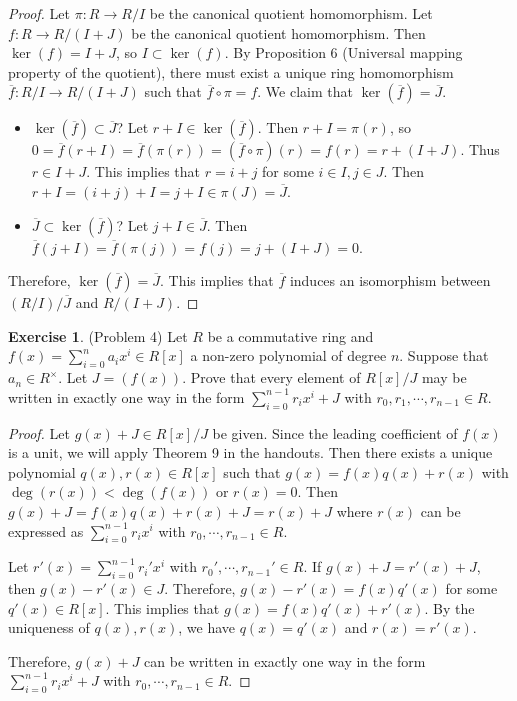 \documentclass[12pt, psamsfonts]{amsart}
\theoremstyle{definition}
\newtheorem*{exer}{Exercise}
\theoremstyle{remark}
\numberwithin{equation}{section}
\begin{document}
\begin{proof}
  Let $\pi: R \rightarrow R / I$ be the canonical quotient homomorphism.
  Let $f: R \rightarrow R / (I + J)$ be the canonical quotient homomorphism.
  Then $\ker(f) = I + J$, so $I \subset \ker(f)$.
  By Proposition 6 (Universal mapping property of the quotient), there must exist a unique ring homomorphism $\overline{f}: R / I \rightarrow R / (I + J)$ such that $\overline{f} \circ \pi = f$.
  We claim that $\ker(\overline{f}) = \overline{J}$.
  \begin{itemize}
    \item
      $\ker(\overline{f}) \subset \overline{J}$?
      Let $r + I \in \ker(\overline{f})$.
      Then $r + I = \pi(r)$, so $0 = \overline{f}(r + I) = \overline{f}(\pi(r)) = (\overline{f} \circ \pi)(r) = f(r) = r + (I + J)$.
      Thus $r \in I + J$.
      This implies that $r = i + j$ for some $i \in I, j \in J$.
      Then $r + I = (i + j) + I = j + I \in \pi(J) = \overline{J}$.
    \item
      $\overline{J} \subset \ker(\overline{f})$?
      Let $j + I \in \overline{J}$.
      Then $\overline{f}(j + I) = \overline{f}(\pi(j)) = f(j) = j + (I + J) = 0$.
  \end{itemize}
  Therefore, $\ker(\overline{f}) = \overline{J}$.
  This implies that $\overline{f}$ induces an isomorphism between $(R / I) / \overline{J}$ and $R / (I + J)$.
\end{proof}

\begin{exer}{(Problem 4)}
  Let $R$ be a commutative ring and $f(x) = \sum_{i=0}^{n} a_ix^i \in R[x]$ a non-zero polynomial of degree $n$.
  Suppose that $a_n \in R^{\times}$.
  Let $J = (f(x))$.
  Prove that every element of $R[x]/J$ may be written in exactly one way in the form $\sum_{i=0}^{n - 1}r_ix^i + J$ with $r_0, r_1, \cdots, r_{n - 1} \in R$.
\end{exer}

\begin{proof}
  Let $g(x) + J \in R[x] / J$ be given.
  Since the leading coefficient of $f(x)$ is a unit, we will apply Theorem 9 in the handouts.
  Then there exists a unique polynomial $q(x), r(x) \in R[x]$ such that $g(x) = f(x)q(x) + r(x)$ with $\deg(r(x)) < \deg(f(x))$ or $r(x) = 0$.
  Then $g(x) + J = f(x)q(x) + r(x) + J = r(x) + J$ where $r(x)$ can be expressed as $\sum_{i = 0}^{n - 1} r_ix^i$ with $r_0, \cdots, r_{n - 1} \in R$.

  Let $r'(x) = \sum_{i = 0}^{n - 1} r_i'x^i$ with $r_0', \cdots, r_{n - 1}' \in R$.
  If $g(x) + J = r'(x) + J$, then $g(x) - r'(x) \in J$.
  Therefore, $g(x) - r'(x) = f(x)q'(x)$ for some $q'(x) \in R[x]$.
  This implies that $g(x) = f(x)q'(x) + r'(x)$.
  By the uniqueness of $q(x), r(x)$, we have $q(x) = q'(x)$ and $r(x) = r'(x)$.

  Therefore, $g(x) + J$ can be written in exactly one way in the form $\sum_{i = 0}^{n - 1} r_ix^i + J$ with $r_0, \cdots, r_{n - 1} \in R$.
\end{proof}
\end{document}
